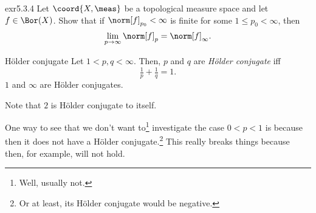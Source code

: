 \begin{exr}{}{exr5.3.4}
Let $\coord{X,\meas}$ be a topological measure space and let $f\in \Bor (X)$.  Show that if $\norm[f]_{p_0}<\infty$ is finite for some $1\leq p_0<\infty$, then
\begin{equation}
\lim _{p\to \infty}\norm[f]_p=\norm[f]_{\infty}.
\end{equation}
\end{exr}
\begin{dfn}{Hölder conjugate}{}
Let $1<p,q<\infty$.  Then, $p$ and $q$ are \emph{Hölder conjugate} iff
\begin{equation}
\tfrac{1}{p}+\tfrac{1}{q}=1.
\end{equation}
$1$ and $\infty$ are Hölder conjugates.
\begin{rmk}
Note that $2$ is Hölder conjugate to itself.
\end{rmk}
\begin{rmk}
One way to see that we don't want to\footnote{Well, usually not.} investigate the case $0<p<1$ is because then it does not have a Hölder conjugate.\footnote{Or at least, its Hölder conjugate would be negative.}  This really breaks things because then, for example,  will not hold.
\end{rmk}
\end{dfn}

